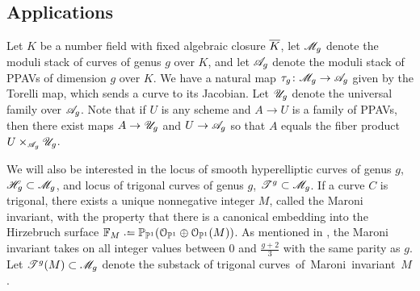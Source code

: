 \subsection{Applications}\label{androidbeatsios}
Let $K$ be a number field with fixed algebraic closure $\overline{K}$, let ${\mathscr M_g}$ denote the moduli stack of curves of genus $g$ over $K$,
and let ${\mathscr A_g}$ denote the moduli stack of PPAVs of dimension $g$ over $K$. We have a natural map $\tau_g \colon {\mathscr M_g} \rightarrow {\mathscr A_g}$ given by the Torelli map, which sends a curve to its Jacobian. Let ${\mathscr U_g}$ denote the universal family over ${\mathscr A_g}$. Note that if $U$ is any scheme and $A \to U$ is a family of PPAVs, then there exist maps $A \to {\mathscr U_g}$ and $U \to {\mathscr A_g}$ so that $A$ equals the fiber product $U \times_{\mathscr A_g} {\mathscr U_g}$.

We will also be interested in the locus of smooth hyperelliptic curves of genus $g$, $\mathscr H_{g} \subset {\mathscr M_g}$, and locus of trigonal curves of genus $g$, $\mathscr T^{g} \subset {\mathscr M_g}$.
If a curve $C$ is trigonal, there exists a unique nonnegative integer $M$, called the Maroni invariant, with the property that there is a canonical embedding into the Hirzebruch surface $\mathbb F_M \defeq \mathbb P_{\mathbb P^1} (\mathcal O_{\mathbb P^1} \oplus \mathcal O_{\mathbb P^1}(M))$. As mentioned in \cite{patel2015chow}, the Maroni invariant takes on all integer values between $0$ and $\frac{g+2}{3}$ with the same parity as $g$. Let $\mathscr T^{g}(M) \subset {\mathscr M_g}$ denote the substack of trigonal \mbox{curves of Maroni invariant $M$.}

